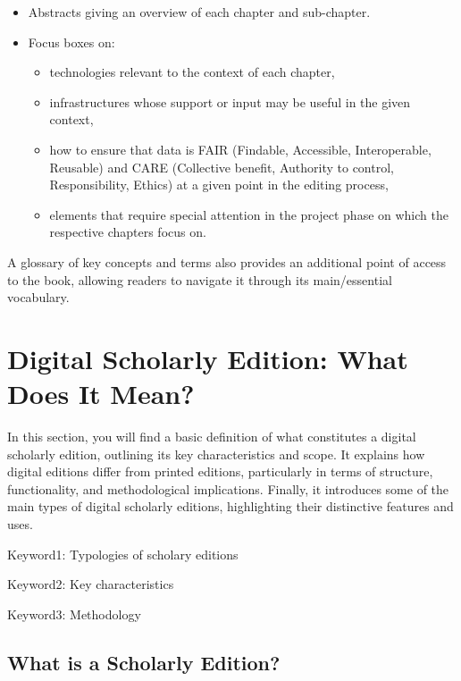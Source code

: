 \documentclass[
  letterpaper,
  DIV=11,
  numbers=noendperiod]{scrreprt}
\begin{document}
\begin{itemize}
\item
  Abstracts giving an overview of each chapter and sub-chapter.
\item
  Focus boxes on:

  \begin{itemize}
  \item
    technologies relevant to the context of each chapter,
  \item
    infrastructures whose support or input may be useful in the given
    context,
  \item
    how to ensure that data is FAIR (Findable, Accessible,
    Interoperable, Reusable) and CARE (Collective benefit, Authority to
    control, Responsibility, Ethics) at a given point in the editing
    process,
  \item
    elements that require special attention in the project phase on
    which the respective chapters focus on.
  \end{itemize}
\end{itemize}

A glossary of key concepts and terms also provides an additional point
of access to the book, allowing readers to navigate it through its
main/essential vocabulary.

\section{Digital Scholarly Edition: What Does It
Mean?}\label{digital-scholarly-edition-what-does-it-mean}

In this section, you will find a basic definition of what constitutes a
digital scholarly edition, outlining its key characteristics and scope.
It explains how digital editions differ from printed editions,
particularly in terms of structure, functionality, and methodological
implications. Finally, it introduces some of the main types of digital
scholarly editions, highlighting their distinctive features and uses.

Keyword1: Typologies of scholary editions

Keyword2: Key characteristics

Keyword3: Methodology

\subsection{What is a Scholarly
Edition?}\label{what-is-a-scholarly-edition}
\end{document}
